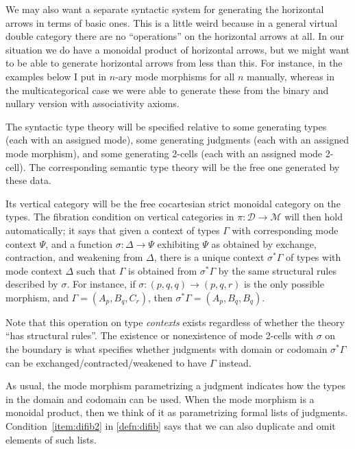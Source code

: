\documentclass{article}
\theoremstyle{definition}
\theoremstyle{remark}
\def\M{\mathcal{M}}
\def\D{\mathcal{D}}
\begin{document}
We may also want a separate syntactic system for generating the horizontal arrows in terms of basic ones.
This is a little weird because in a general virtual double category there are no ``operations'' on the horizontal arrows at all.
In our situation we do have a monoidal product of horizontal arrows, but we might want to be able to generate horizontal arrows from less than this.
For instance, in the examples below I put in $n$-ary mode morphisms for all $n$ manually, whereas in the multicategorical case we were able to generate these from the binary and nullary version with associativity axioms.

The syntactic type theory will be specified relative to some generating types (each with an assigned mode), some generating judgments (each with an assigned mode morphism), and some generating 2-cells (each with an assigned mode 2-cell).
The corresponding semantic type theory will be the free one generated by these data.

Its vertical category will be the free cocartesian strict monoidal category on the types.
The fibration condition on vertical categories in $\pi:\D\to\M$ will then hold automatically; it says that given a context of types $\Gamma$ with corresponding mode context $\Psi$, and a function $\sigma:\Delta\to\Psi$ exhibiting $\Psi$ as obtained by exchange, contraction, and weakening from $\Delta$, there is a unique context $\sigma^*\Gamma$ of types with mode context $\Delta$ such that $\Gamma$ is obtained from $\sigma^*\Gamma$ by the same structural rules described by $\sigma$.
For instance, if $\sigma : (p,q,q) \to (p,q,r)$ is the only possible morphism, and $\Gamma = (A_p,B_q,C_r)$, then $\sigma^*\Gamma = (A_p,B_q,B_q)$.

Note that this operation on type \emph{contexts} exists regardless of whether the theory ``has structural rules''.
The existence or nonexistence of mode 2-cells with $\sigma$ on the boundary is what specifies whether judgments with domain or codomain $\sigma^*\Gamma$ can be exchanged/contracted/weakened to have $\Gamma$ instead.

As usual, the mode morphism parametrizing a judgment indicates how the types in the domain and codomain can be used.
When the mode morphism is a monoidal product, then we think of it as parametrizing formal lists of judgments.
Condition~\ref{item:difib2} in \cref{defn:difib} says that we can also duplicate and omit elements of such lists.
\end{document}
